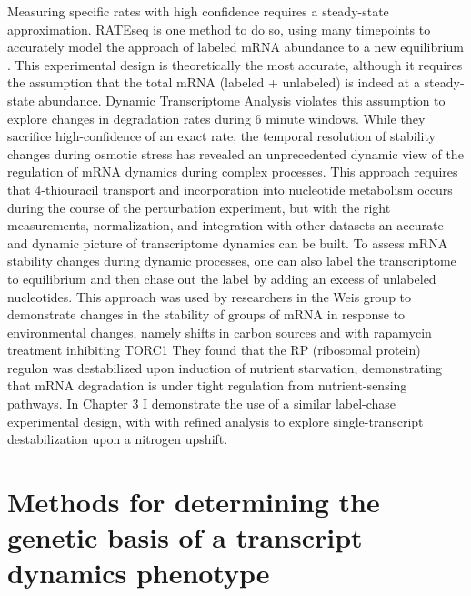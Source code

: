 Measuring specific rates with high confidence
requires a steady-state approximation. RATEseq is one method to do so,
using many timepoints to accurately model the approach of labeled mRNA
abundance to a new equilibrium 
\parencite{neymotin2014determination}. This
experimental design is theoretically the most accurate, although it
requires the assumption that the total mRNA (labeled + unlabeled) is
indeed at a steady-state abundance. Dynamic Transcriptome Analysis
\parencite{miller2011dynamic}
violates this assumption to explore changes in
degradation rates during 6 minute windows. While they sacrifice
high-confidence of an exact rate, the temporal resolution of stability
changes during osmotic stress has revealed an unprecedented dynamic
view of the regulation of mRNA dynamics during complex processes. This
approach requires that 4-thiouracil transport and incorporation into
nucleotide metabolism occurs during the course of the perturbation
experiment, but with the right measurements, normalization, and
integration with other datasets an accurate and dynamic picture of
transcriptome dynamics can be built. To assess mRNA stability changes
during dynamic processes, one can also label the transcriptome to
equilibrium and then chase out the label by adding an excess of
unlabeled nucleotides. This approach was used by researchers in the
Weis group to demonstrate changes in the stability of groups of mRNA
in response to environmental changes, namely shifts in carbon sources
and with rapamycin treatment inhibiting TORC1
\parencite{munchel2011dynamic}
They found that the RP (ribosomal protein) regulon was destabilized
upon induction of nutrient starvation, demonstrating that mRNA
degradation is under tight regulation from nutrient-sensing pathways.
In Chapter 3 I demonstrate the use of a similar label-chase
experimental design, with with refined analysis to explore
single-transcript destabilization upon a nitrogen upshift.  

\section{Methods for determining the genetic basis of a transcript
dynamics phenotype}

